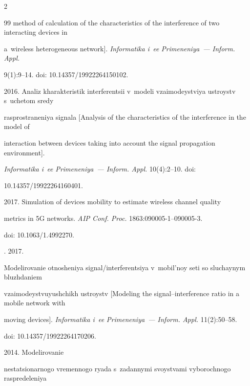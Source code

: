 \begin{multicols}{2}
{{\begin{thebibliography}{99}
method of calculation of the characteristics of the interference of two interacting devices in 


a~wireless heterogeneous network]. \textit{Informatika i~ee Primeneniya~--- Inform. Appl.} 


9(1):9--14. doi: 10.14357/19922264150102.






2016. Analiz kharakteristik interferentsii v~modeli vzaimodeystviya ustroystv s~uchetom sredy 


rasprostraneniya signala [Analysis of the characteristics of the interference in the model of 


interaction between devices taking into account the signal propagation environment]. 


\textit{Informatika i~ee Primeneniya~--- Inform. Appl.} 10(4):2--10. doi: 


10.14357/19922264160401.




 2017. Simulation of devices mobility to estimate wireless channel quality 


metrics in 5G networks. \textit{AIP Conf. Proc.} 1863:090005-1--090005-3. 


doi: 10.1063/1.4992270.




. 2017. 


Modelirovanie otnosheniya signal/interferentsiya v~mobil'noy seti so sluchaynym bluzhdaniem 


vzaimodeystvuyushchikh ustroystv [Modeling the signal--interference ratio in a mobile network with 


moving devices]. \textit{Informatika i~ee Primeneniya~--- Inform. Appl.} 11(2):50--58. 


doi:  10.14357/19922264170206.




 2014. Modelirovanie 


nestatsionarnogo vremennogo ryada s~zadannymi svoystvami vyborochnogo raspredeleniya 



\end{thebibliography}}}
\end{multicols}
